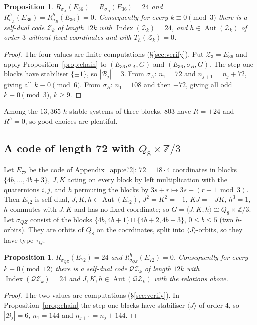 \documentclass[11pt]{amsart}
\newtheorem{proposition}[theorem]{Proposition}
\theoremstyle{definition}
\newcommand{\Z}{\mathbb{Z}}
\newcommand{\Index}{\operatorname{Index}}
\newcommand{\Aut}{\operatorname{Aut}}
\newcommand{\cB}{\mathcal{B}}
\begin{document}
\begin{proposition}\label{prop:Zfamily}
$R_{\sigma_A}(E_{36})=R_{\sigma_B}(E_{36})=24$ and $R^h_{\sigma_A}(E_{36})=R^h_{\sigma_B}(E_{36})=0$.
Consequently for every $k\equiv0\pmod3$ there is a self-dual code $\mathcal Z_k$ of length $12k$ with
$\Index(\mathcal Z_k)=24$, and $h\in\Aut(\mathcal Z_k)$ of order $3$ without fixed coordinates and
with $T_h(\mathcal Z_k)=0$.
\end{proposition}

\begin{proof}
The four values are finite computations (\S\ref{sec:verify}). Put $\mathcal Z_3=E_{36}$ and apply
Proposition~\ref{prop:chain} to $(E_{36},\sigma_A,G)$ and $(E_{36},\sigma_B,G)$. The step-one blocks
have stabiliser $\{\pm1\}$, so $|\cB_j|=3$. From $\sigma_A$: $n_1=72$ and $n_{j+1}=n_j+72$, giving all
$k\equiv0\pmod6$. From $\sigma_B$: $n_1=108$ and then $+72$, giving all odd $k\equiv0\pmod3$, $k\ge9$.
\end{proof}

Among the $13{,}365$ $h$-stable systems of three blocks, $803$ have $R=\pm24$ and $R^h=0$, so good
choices are plentiful.

\subsection{A code of length 72 with \texorpdfstring{$Q_8\times\Z/3$}{Q8 x Z/3}}
Let $E_{72}$ be the code of Appendix~\ref{app:e72}: $72=18\cdot4$ coordinates in blocks
$\{4b,\dots,4b+3\}$, $J,K$ acting on every block by left multiplication with the quaternions $i,j$,
and $h$ permuting the blocks by $3s+r\mapsto3s+(r+1\bmod3)$. Then $E_{72}$ is self-dual,
$J,K,h\in\Aut(E_{72})$, $J^2=K^2=-1$, $KJ=-JK$, $h^3=1$, $h$ commutes with $J,K$ and has no fixed
coordinate; so $G=\langle J,K,h\rangle\cong Q_8\times\Z/3$. Let $\sigma_{QZ}$ consist of the blocks
$\{4b,4b+1\}\sqcup\{4b+2,4b+3\}$, $0\le b\le5$ (two $h$-orbits). They are orbits of $Q_8$ on the
coordinates, split into $\langle J\rangle$-orbits, so they have type $\tau_Q$.

\begin{proposition}\label{prop:QZfamily}
$R_{\sigma_{QZ}}(E_{72})=24$ and $R^h_{\sigma_{QZ}}(E_{72})=0$. Consequently for every
$k\equiv0\pmod{12}$ there is a self-dual code $\mathcal{QZ}_k$ of length $12k$ with
$\Index(\mathcal{QZ}_k)=24$ and $J,K,h\in\Aut(\mathcal{QZ}_k)$ with the relations above.
\end{proposition}

\begin{proof}
The two values are computations (\S\ref{sec:verify}). In Proposition~\ref{prop:chain} the step-one
blocks have stabiliser $\langle J\rangle$ of order $4$, so $|\cB_j|=6$, $n_1=144$ and
$n_{j+1}=n_j+144$.
\end{proof}
\end{document}
